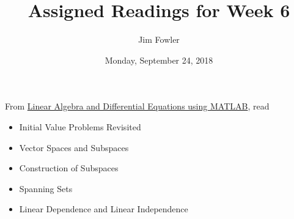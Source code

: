 \documentclass{homework}
\author{Jim Fowler}
\title{Assigned Readings for Week 6}
\date{Monday, September 24, 2018}
\begin{document}
\maketitle

From \href{/courses/43735/files/folder/textbooks}{Linear Algebra and Differential Equations using MATLAB}, read 
\begin{itemize}
\item {} Initial Value Problems Revisited
\item {} Vector Spaces and Subspaces
\item {} Construction of Subspaces
\item {} Spanning Sets
\item {} Linear Dependence and Linear Independence
\end{itemize}
\end{document}
